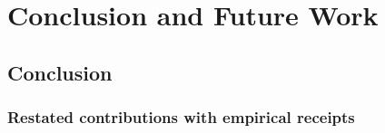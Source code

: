 
\chapter{Conclusion and Future Work}
\label{ch:conclusion}


\section{Conclusion}
\label{sec:conclusion}

\subsection{Restated contributions with empirical receipts}
\label{sec:concl-contributions}

